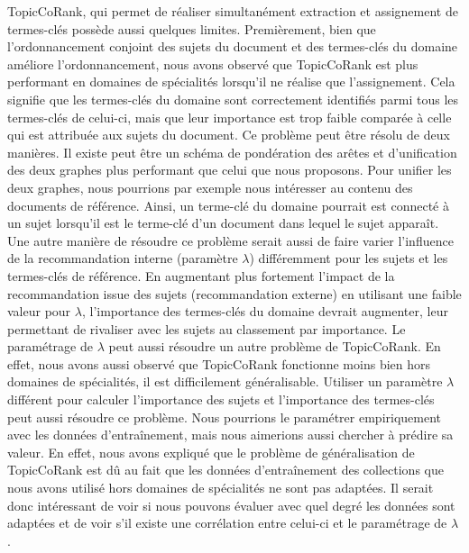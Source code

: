    TopicCoRank, qui permet de réaliser simultanément extraction et assignement
    de termes-clés possède aussi quelques limites. Premièrement, bien que
    l'ordonnancement conjoint des sujets du document et des termes-clés du
    domaine améliore l'ordonnancement, nous avons observé que TopicCoRank est
    plus performant en domaines de spécialités lorsqu'il ne réalise que
    l'assignement. Cela signifie que les termes-clés du domaine sont
    correctement identifiés parmi tous les termes-clés de celui-ci, mais que
    leur importance est trop faible comparée à celle qui est attribuée aux
    sujets du document. Ce problème peut être résolu de deux manières. Il existe
    peut être un schéma de pondération des arêtes et d'unification des deux
    graphes plus performant que celui que nous proposons. Pour unifier les deux
    graphes, nous pourrions par exemple nous intéresser au contenu des documents
    de référence. Ainsi, un terme-clé du domaine pourrait est connecté à un
    sujet lorsqu'il est le terme-clé d'un document dans lequel le sujet
    apparaît. Une autre manière de résoudre ce problème serait aussi de faire
    varier l'influence de la recommandation interne (paramètre $\lambda$)
    différemment pour les sujets et les termes-clés de référence. En augmentant
    plus fortement l'impact de la recommandation issue des sujets
    (recommandation externe) en utilisant une faible valeur pour $\lambda$,
    l'importance des termes-clés du domaine devrait augmenter, leur permettant
    de rivaliser avec les sujets au classement par importance. Le paramétrage de
    $\lambda$ peut aussi résoudre un autre problème de TopicCoRank. En effet,
    nous avons aussi observé que TopicCoRank fonctionne moins bien hors domaines
    de spécialités, il est difficilement généralisable. Utiliser un paramètre
    $\lambda$ différent pour calculer l'importance des sujets et l'importance
    des termes-clés peut aussi résoudre ce problème. Nous pourrions le
    paramétrer empiriquement avec les données d'entraînement, mais nous
    aimerions aussi chercher à prédire sa valeur. En effet, nous avons expliqué
    que le problème de généralisation de TopicCoRank est dû au fait que les
    données d'entraînement des collections que nous avons utilisé hors domaines
    de spécialités ne sont pas adaptées. Il serait donc intéressant de voir si
    nous pouvons évaluer avec quel degré les données sont adaptées et de voir
    s'il existe une corrélation entre celui-ci et le paramétrage de $\lambda$.

